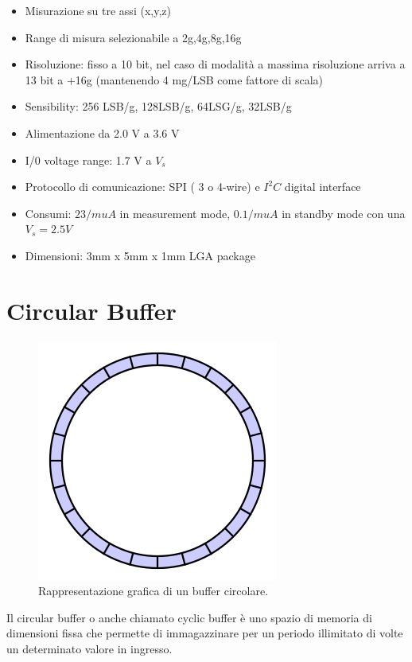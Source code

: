 \documentclass[LaM,binding=0.6cm]{../sapthesis}
\begin{document}
\begin{itemize}
    \item Misurazione su tre assi (x,y,z)
     
    \item Range di misura selezionabile a 2g,4g,8g,16g
    
    \item Risoluzione: fisso a 10 bit, nel caso di modalità a massima risoluzione arriva a 13 bit a          +16g (mantenendo 4 mg/LSB come fattore di scala) 
    
    \item Sensibility: 256 LSB/g, 128LSB/g, 64LSG/g, 32LSB/g

     \item Alimentazione da 2.0 V  a 3.6 V

     \item I/0 voltage range: 1.7 V a $V_s$

     \item Protocollo di comunicazione: SPI ( 3 o 4-wire) e $I^2C$ digital interface

     \item Consumi: $23 /mu A$ in measurement mode, $0.1 /mu A$ in standby mode con una $V_s = 2.5V$

     \item Dimensioni: 3mm x 5mm x 1mm LGA package
\end{itemize}



\section{Circular Buffer}
\begin{figure}[htbp]
\centerline{\includegraphics[scale=0.5]{examples/CircularBuffer.PNG}}
\caption{Rappresentazione grafica di un buffer circolare.}
\label{fig}
\end{figure}
\newline
Il circular buffer o anche chiamato cyclic buffer è uno spazio di memoria di dimensioni fissa che permette di immagazzinare per un periodo illimitato di volte un determinato valore in ingresso.
\end{document}
